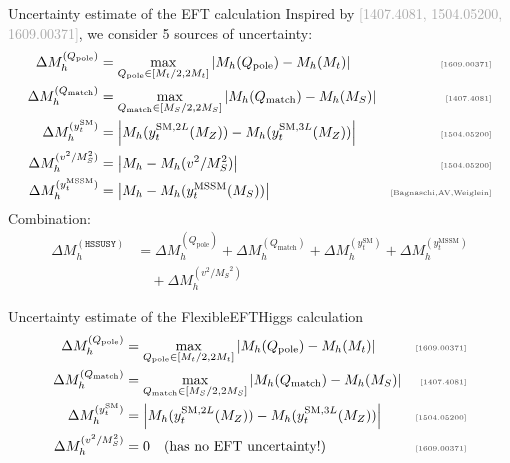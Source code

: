 \documentclass[hyperref={pdfpagelabels=false},ngerman]{beamer}
\newcommand{\MS}{\ensuremath{M_S}}
\newcommand{\mycite}[1]{\ensuremath{\text{\textcolor{darkgray}{\tiny [#1]}}}}
\newcommand{\bigcite}[1]{\textcolor{darkgray}{[#1]}}
\newcommand{\SM}{\ensuremath{\text{SM}}}
\newcommand{\MSSM}{\ensuremath{\text{MSSM}}}
\newcommand{\Qpole}{\ensuremath{Q_\text{pole}}}
\newcommand{\Qmatch}{\ensuremath{Q_\text{match}}}
\newcommand{\DMhQpole}{\ensuremath{\Delta M_h^{(\Qpole)}}}
\newcommand{\DMhQmatch}{\ensuremath{\Delta M_h^{(\Qmatch)}}}
\newcommand{\DMhHSSUSY}{\ensuremath{\Delta M_h^{(\HSSUSY)}}}
\newcommand{\DMhHSSUSYytSM}{\ensuremath{\Delta M_h^{(y_t^\SM)}}}
\newcommand{\DMhHSSUSYytMSSM}{\ensuremath{\Delta M_h^{(y_t^\MSSM)}}}
\newcommand{\DMhEFT}{\ensuremath{\Delta M_h^{(v^2/\MS^2)}}}
\def\HSSUSY{\texttt{HSSUSY}}
\begin{document}

\begin{frame}[noframenumbering]{Uncertainty estimate of the EFT calculation}
  Inspired by \bigcite{1407.4081, 1504.05200, 1609.00371}, we consider
  5 sources of uncertainty:
  \begin{align*}
    \DMhQpole &= \max_{\Qpole\in[M_t/2,2M_t]}\left|M_h(\Qpole) - M_h(M_t)\right| & \text{\mycite{1609.00371}} \\
    \DMhQmatch &= \max_{\Qmatch\in[\MS/2,2\MS]}\left|M_h(\Qmatch) - M_h(\MS)\right| & \text{\mycite{1407.4081}} \\
    \DMhHSSUSYytSM &= \left| M_h(y_t^{\SM,2L}(M_Z)) - M_h(y_t^{\SM,3L}(M_Z)) \right| & \text{\mycite{1504.05200}} \\
    \DMhEFT &= \left| M_h - M_h(v^2/\MS^2) \right| & \text{\mycite{1504.05200}} \\
    \DMhHSSUSYytMSSM &= \left| M_h - M_h(y_t^\MSSM(\MS)) \right| & \text{\mycite{Bagnaschi,AV,Weiglein}}
  \end{align*}
  Combination:
  \begin{align*}
    \DMhHSSUSY &= \DMhQpole + \DMhQmatch + \DMhHSSUSYytSM + \DMhHSSUSYytMSSM \\
    &\quad + \DMhEFT
  \end{align*}
\end{frame}


\begin{frame}[noframenumbering]{Uncertainty estimate of the FlexibleEFTHiggs calculation}
  \begin{align*}
    \DMhQpole &= \max_{\Qpole\in[M_t/2,2M_t]}\left|M_h(\Qpole) - M_h(M_t)\right| & \text{\mycite{1609.00371}} \\
    \DMhQmatch &= \max_{\Qmatch\in[\MS/2,2\MS]}\left|M_h(\Qmatch) - M_h(\MS)\right| & \text{\mycite{1407.4081}} \\
    \DMhHSSUSYytSM &= \left| M_h(y_t^{\SM,2L}(M_Z)) - M_h(y_t^{\SM,3L}(M_Z)) \right| & \text{\mycite{1504.05200}} \\
    \DMhEFT &= 0 \quad \text{(has no EFT uncertainty!)} & \text{\mycite{1609.00371}}
  \end{align*}
\end{frame}
\end{document}
